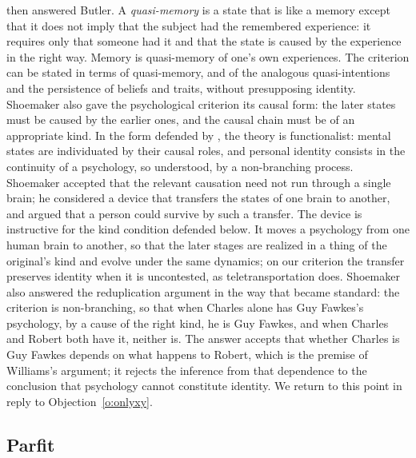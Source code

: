 \documentclass{situationist-preprint}
\begin{document}
\citet{Shoemaker1970} then answered Butler. A \emph{quasi-memory} is a state that is like a memory except that it does not imply that the subject had the remembered experience: it requires only that someone had it and that the state is caused by the experience in the right way. Memory is quasi-memory of one's own experiences. The criterion can be stated in terms of quasi-memory, and of the analogous quasi-intentions and the persistence of beliefs and traits, without presupposing identity. Shoemaker also gave the psychological criterion its causal form: the later states must be caused by the earlier ones, and the causal chain must be of an appropriate kind. In the form defended by \citet{Shoemaker1984}, the theory is functionalist: mental states are individuated by their causal roles, and personal identity consists in the continuity of a psychology, so understood, by a non-branching process. Shoemaker accepted that the relevant causation need not run through a single brain; he considered a device that transfers the states of one brain to another, and argued that a person could survive by such a transfer. The device is instructive for the kind condition defended below. It moves a psychology from one human brain to another, so that the later stages are realized in a thing of the original's kind and evolve under the same dynamics; on our criterion the transfer preserves identity when it is uncontested, as teletransportation does. Shoemaker also answered the reduplication argument in the way that became standard: the criterion is non-branching, so that when Charles alone has Guy Fawkes's psychology, by a cause of the right kind, he is Guy Fawkes, and when Charles and Robert both have it, neither is. The answer accepts that whether Charles is Guy Fawkes depends on what happens to Robert, which is the premise of Williams's argument; it rejects the inference from that dependence to the conclusion that psychology cannot constitute identity. We return to this point in reply to Objection~\ref{o:onlyxy}.

\subsection{Parfit}
\end{document}
